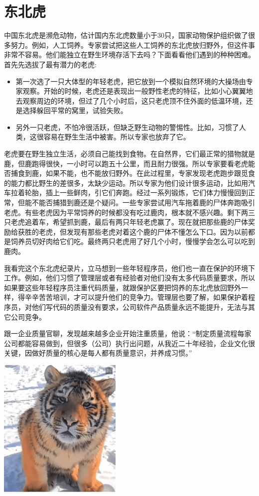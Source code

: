 \chapter{东北虎} %

中国东北虎是濒危动物，估计国内东北虎数量小于30只，国家动物保护组织做了很多努力。例如，人工饲养。专家尝试把这些人工饲养的东北虎放归野外，但这件事非常不容易。他们能独立在野生环境存活下去吗？下面看看他们遇到的种种困难。\\
首先先选拔了最有潜力的老虎:

\begin{itemize}
\tightlist
\item
  第一次选了一只大体型的年轻老虎，把它放到一个模拟自然环境的大操场由专家观察。开始的时候，老虎还是表现出一般野性老虎的特征，比如小心翼翼地去观察周边的环境，但过了几个小时后，这只老虎顶不住外面的低温环境，还是选择躲回平常的窝里，试验失败。
\item
  另外一只老虎，不怕冷很活跃，但缺乏野生动物的警惕性。比如，习惯了人类，这很容易在野生生活中被害。所以专家也放弃了它。
\end{itemize}

老虎要在野生独立生活，必须自己能找到食物。在自然界，它们最正常的猎物就是鹿，但鹿跑得很快，一小时可以跑五十公里，而且耐力很强。所以专家要看老虎能否捕食到鹿，如果不能，也不能放归野外。在此过程里，专家发现老虎跑步跟觅食的能力都比野生的差很多，太缺少运动。所以专家为他们设计很多运动，比如用汽车拉着轮胎，插上一些鲜肉，引它们奔跑。经过一系列锻炼，它们体力慢慢回到正常，但能不能否捕猎到鹿还是个疑问。一些专家尝试用汽车拖着鹿的尸体奔跑吸引老虎。有些老虎因为平常饲养的时候都没有吃过鹿肉，根本就不感兴趣。剩下两三只老虎追着车，希望抓到鹿，最后有两只年轻老虎赢了。现在就把那些鹿的尸体奖励给获胜的老虎，但发现有那些老虎对着这个鹿的尸体不懂怎么下口。因为以前都是饲养员切好肉给它们吃。最终两只老虎用了好几个小时，慢慢学会怎么可以吃到鹿肉。

我看完这个东北虎纪录片，立马想到一些年轻程序员，他们也一直在保护的环境下工作。例如，他们习惯了管理层或者有经验者对他们没有太多代码质量要求，所以如果要这些年轻程序员注重代码质量，就跟保护区要把饲养的东北虎放回野外一样，得辛辛苦苦培训，才可以提升他们的竞争力。管理层也要了解，如果保护着程序员，对他们写代码的质量没有要求，公司软件产品质量永远不能提升，无法与其它公司竞争。

跟一企业质量官聊，发现越来越多企业开始注重质量，他说：``制定质量流程每家公司都能容易做到，但很多（公司）执行出问题，从我近二十年经验，企业文化很关键，因做好质量的核心是每人都有质量意识，并养成习惯。''


\includegraphics[width=6cm]{TigerScreenshot_2022-11-29_082120.jpg}




